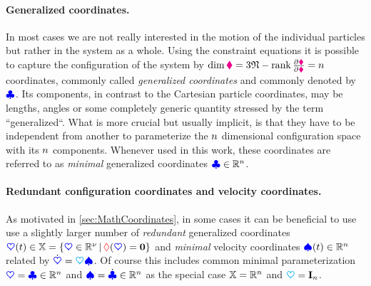 \paragraph{Generalized coordinates.} 
In most cases we are not really interested in the motion of the individual particles but rather in the system as a whole.
Using the constraint equations it is possible to capture the configuration of the system by $\dim\particleConfigSpace = 3\numParticles - \rank\pdiff[\particleGeoConstraint]{\particleCoord} = \dimConfigSpace$ coordinates, commonly called \textit{generalized coordinates} and commonly denoted by $\genCoord$.
Its components, in contrast to the Cartesian particle coordinates, may be lengths, angles or some completely generic quantity stressed by the term ``generalized``.
What is more crucial but usually implicit, is that they have to be independent from another to parameterize the $\dimConfigSpace$ dimensional configuration space with its $\dimConfigSpace$ components.
Whenever used in this work, these coordinates are referred to as \textit{minimal} generalized coordinates $\genCoord\in\RealNum^\dimConfigSpace$.

\paragraph{Redundant configuration coordinates and velocity coordinates.} 
As motivated in \autoref{sec:MathCoordinates}, in some cases it can be beneficial to use use a slightly larger number of \textit{redundant} generalized coordinates $\sysCoord(t) \in \configSpace = \{ \sysCoord \in \RealNum^{\numCoord} \, | \, \geoConstraint(\sysCoord) = \tuple{0} \}$ and \textit{minimal} velocity coordinates $\sysVel(t) \in \RealNum^{\dimConfigSpace}$ related by $\sysCoordd = \kinMat \sysVel$.
Of course this includes common minimal parameterization $\sysCoord = \genCoord \in \RealNum^{\dimConfigSpace}$ and $\sysVel=\genCoordd \in \RealNum^{\dimConfigSpace}$ as the special case $\configSpace=\RealNum^{\dimConfigSpace}$ and $\kinMat=\idMat[\dimConfigSpace]$.

